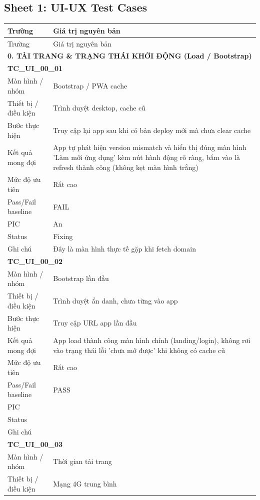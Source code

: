 \documentclass[12pt,a4paper]{article}
\begin{document}
\subsection{Sheet 1: UI-UX Test Cases}
\begin{longtable}{p{3.0cm}p{11.5cm}}
\toprule Trường & Giá trị nguyên bản \\ \midrule
\endfirsthead
\toprule Trường & Giá trị nguyên bản \\ \midrule
\endhead
\multicolumn{2}{l}{\textbf{0. TẢI TRANG \& TRẠNG THÁI KHỞI ĐỘNG (Load / Bootstrap)}} \\ \midrule
\multicolumn{2}{l}{\textbf{TC\_UI\_00\_01}} \\
Màn hình / nhóm & Bootstrap / PWA cache \\
Thiết bị / điều kiện & Trình duyệt desktop, cache cũ \\
Bước thực hiện & Truy cập lại app sau khi có bản deploy mới mà chưa clear cache \\
Kết quả mong đợi & App tự phát hiện version mismatch và hiển thị đúng màn hình 'Làm mới ứng dụng' kèm nút hành động rõ ràng, bấm vào là refresh thành công (không kẹt màn hình trắng) \\
Mức độ ưu tiên & Rất cao \\
Pass/Fail baseline & FAIL \\
PIC & An \\
Status & Fixing \\
Ghi chú & Đây là màn hình thực tế gặp khi fetch domain \\
\midrule
\multicolumn{2}{l}{\textbf{TC\_UI\_00\_02}} \\
Màn hình / nhóm & Bootstrap lần đầu \\
Thiết bị / điều kiện & Trình duyệt ẩn danh, chưa từng vào app \\
Bước thực hiện & Truy cập URL app lần đầu \\
Kết quả mong đợi & App load thành công màn hình chính (landing/login), không rơi vào trạng thái lỗi 'chưa mở được' khi không có cache cũ \\
Mức độ ưu tiên & Rất cao \\
Pass/Fail baseline & PASS \\
PIC &  \\
Status &  \\
Ghi chú &  \\
\midrule
\multicolumn{2}{l}{\textbf{TC\_UI\_00\_03}} \\
Màn hình / nhóm & Thời gian tải trang \\
Thiết bị / điều kiện & Mạng 4G trung bình \\

\end{longtable}
\end{document}
